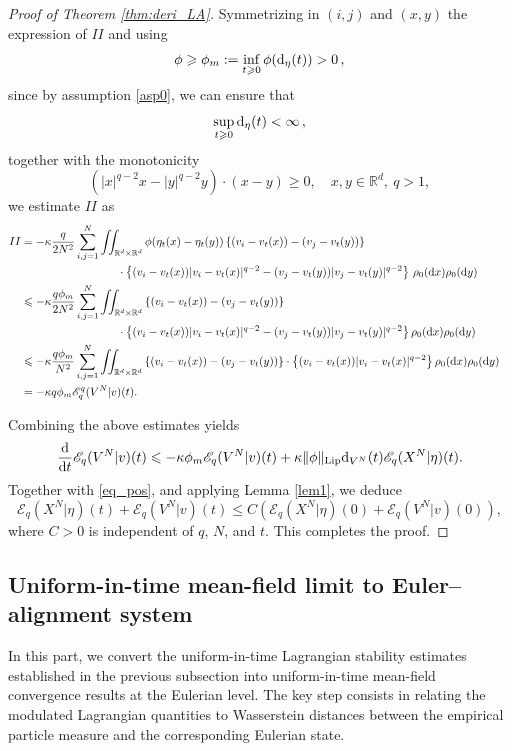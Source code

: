 \documentclass[10pt,reqno]{amsart}
\renewcommand{\geq}{\geqslant}
\renewcommand{\ge}{\geqslant}
\renewcommand{\leq}{\leqslant}
\numberwithin{equation}{section}
\newcommand{\R}{\mathbb R}
\newcommand{\lt}{\left}
\newcommand{\rt}{\right}
\newcommand{\intrr}{\iint_{\R^d \times \R^d}}
\newcommand{\rd}{\textnormal{d}}
\newcommand{\dx}{\textnormal{d}x}
\newcommand{\dt}{\textnormal{d}t}
\newcommand{\dy}{\textnormal{d}y}
\begin{document}
\begin{proof}[Proof of Theorem \ref{thm:deri_LA}]
Symmetrizing in $(i,j)$ and $(x,y)$ the expression of $II$ and using 
\[
\phi\ge\phi_m:= \inf_{t \geq 0}\phi(\rd_\eta(t))>0\,,
\] since by assumption \eqref{asp0}, we can ensure that
$$
\sup_{t\ge0} \rd_\eta(t)<\infty\,,
$$ 
together with the monotonicity
  \[
( |x|^{q-2}x - |y|^{q-2}y) \cdot (x-y) \geq 0, \quad x,y \in \R^d, \ q> 1,
  \]
we estimate $II$ as
 \begin{align*}
 II &= -\kappa\frac q{2N^2} \sum_{i,j=1}^N \intrr \phi(\eta_t(x) - \eta_t(y)) \lt\{(v_i - v_t(x)) - (v_j - v_t(y))\rt\} \cr
& \hspace{3cm} \cdot \lt\{(v_i - v_t(x))|v_i - v_t(x)|^{q-2} - (v_j - v_t(y))|v_j - v_t(y)|^{q-2} \rt\}\,\rho_0(\dx)\rho_0(\dy)\cr
 &\leq -\kappa\frac{ q\phi_m}{2N^2} \sum_{i,j=1}^N \intrr  \lt\{(v_i - v_t(x)) - (v_j - v_t(y))\rt\} \cr
& \hspace{3cm} \cdot \lt\{(v_i - v_t(x))|v_i - v_t(x)|^{q-2} - (v_j - v_t(y))|v_j - v_t(y)|^{q-2} \rt\}\rho_0(\dx)\rho_0(\dy)\cr
 &\leq -\kappa\frac{ q\phi_m}{N^2} \sum_{i,j=1}^N \intrr  \lt\{(v_i - v_t(x)) - (v_j - v_t(y))\rt\}  \cdot \lt\{(v_i - v_t(x))|v_i - v_t(x)|^{q-2}  \rt\} \rho_0(\dx)\rho_0(\dy)\cr
 &= - \kappa q\phi_m  \mathscr{E}_q^q(V^N|v)(t).
  \end{align*}
  
Combining the above estimates yields
\[
\frac{\rd}{\dt}\mathscr{E}_q(V^N|v)(t) \leq -\kappa\phi_m  \mathscr{E}_q(V^N|v)(t) + \kappa  \|\phi\|_{\rm Lip} \rd_{V^N}(t) \mathscr{E}_q(X^N|\eta)(t).
\]
Together with \eqref{eq_pos}, and applying Lemma \ref{lem1}, we deduce
\[
\mathscr{E}_q(X^N|\eta)(t) + \mathscr{E}_q(V^N|v)(t) \leq C\lt(\mathscr{E}_q(X^N|\eta)(0) + \mathscr{E}_q(V^N|v)(0) \rt),
\]
where $C>0$ is independent of $q$, $N$, and $t$. This completes the proof.
 \end{proof}
 
 


%
%
%
%
%
\subsection{Uniform-in-time mean-field limit to Euler--alignment system}
In this part, we convert the uniform-in-time Lagrangian stability estimates established in the previous subsection into uniform-in-time mean-field convergence results at the Eulerian level. The key step consists in relating the modulated Lagrangian quantities to Wasserstein distances between the empirical particle measure and the corresponding Eulerian state.
\end{document}
